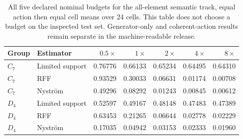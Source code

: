 \begin{table}[htbp]
\caption{All five declared nominal budgets for the all-element semantic track, equal action then equal cell means over 24 cells. This table does not choose a budget on the inspected test set. Generator-only and coherent-action results remain separate in the machine-readable release.}
\label{tab:reproduction-budgets}\centering\small
\begin{tabular}{llrrrrr}\toprule
Group & Estimator & $0.5\times$ & $1\times$ & $2\times$ & $4\times$ & $8\times$ \\
\midrule
$C_7$ & Limited support & 0.76776 & 0.66133 & 0.65234 & 0.64495 & 0.64310 \\
$C_7$ & RFF & 0.93529 & 0.30033 & 0.06631 & 0.01174 & 0.00708 \\
$C_7$ & Nystr\"om & 0.49296 & 0.08292 & 0.01243 & 0.00845 & 0.00612 \\
$D_4$ & Limited support & 0.52597 & 0.49167 & 0.48148 & 0.47483 & 0.47389 \\
$D_4$ & RFF & 0.63453 & 0.21265 & 0.06644 & 0.02778 & 0.02229 \\
$D_4$ & Nystr\"om & 0.17035 & 0.04942 & 0.03153 & 0.02333 & 0.01960 \\
\bottomrule\end{tabular}
\end{table}
